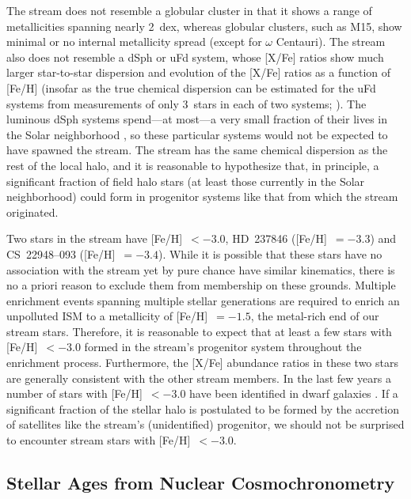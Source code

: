 \documentclass{emulateapj}
\begin{document}
The stream does not resemble a globular cluster in that it shows
a range of metallicities spanning nearly 2~dex, whereas
globular clusters, such as M15, show minimal or no
internal metallicity spread
(except for $\omega$ Centauri).
The stream also does not resemble a dSph or uFd system,
whose [X/Fe] ratios show much larger star-to-star dispersion
and evolution of the [X/Fe] ratios as a function of [Fe/H]
(insofar as the true chemical dispersion can be estimated 
for the uFd systems from measurements of only 3~stars in 
each of two systems; \citealt{frebel09}).
The luminous dSph systems spend---at most---a very
small fraction of their lives in the Solar neighborhood
\citep{roederer09a},
so these particular systems would not be expected to 
have spawned the stream.
The stream has the same chemical dispersion
as the rest of the local halo, and it is
reasonable to hypothesize that, in principle, 
a significant fraction of field halo stars
(at least those currently in the Solar neighborhood)
could form in progenitor systems like 
that from which the stream originated.

Two stars in the stream have [Fe/H]~$< -3.0$, \mbox{HD~237846}
([Fe/H]~$= -3.3$) and \mbox{CS~22948--093} ([Fe/H]~$= -3.4$).
While it is possible that these stars have no association
with the stream yet by pure chance have similar kinematics,
there is no a priori reason
to exclude them from membership on these grounds.
Multiple enrichment events spanning multiple stellar generations 
are required to enrich an unpolluted 
ISM to a metallicity of [Fe/H]~$= -1.5$, the metal-rich end of our
stream stars.
Therefore, it is reasonable to expect that at least a few stars
with [Fe/H]~$< -3.0$ formed in the stream's progenitor system
throughout the enrichment process.
Furthermore, the [X/Fe] abundance ratios in these two stars are
generally consistent with the other stream members.
In the last few years a number of stars with [Fe/H]~$< -3.0$ have
been identified in dwarf galaxies
\citep{cohen09,frebel09,geha09,kirby09,norris09}.
If a significant fraction of the stellar halo is postulated 
to be formed by the accretion of satellites 
like the stream's (unidentified) progenitor,
we should not be surprised to encounter stream stars with [Fe/H]~$< -3.0$.


\subsection{Stellar Ages from Nuclear Cosmochronometry}
\label{ages}
\end{document}
